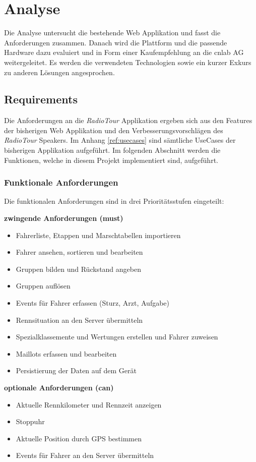 \chapter{Analyse}
Die Analyse untersucht die bestehende Web Applikation und fasst die Anforderungen zusammen. Danach wird die Plattform und die passende Hardware dazu evaluiert und in Form einer Kaufempfehlung an die cnlab AG weitergeleitet. Es werden die verwendeten Technologien sowie ein kurzer Exkurs zu anderen Lösungen angesprochen.

\section{Requirements}
Die Anforderungen an die \textit{RadioTour} Applikation ergeben sich aus den Features der bisherigen Web Applikation und den Verbesserungsvorschlägen des \textit{RadioTour} Speakers. Im Anhang \ref{ref:usecases} sind sämtliche UseCases der bisherigen Applikation aufgeführt. Im folgenden Abschnitt werden die Funktionen, welche in diesem Projekt implementiert sind, aufgeführt.

\subsection{Funktionale Anforderungen}
Die funktionalen Anforderungen sind in drei Prioritätsstufen eingeteilt:

\textbf{zwingende Anforderungen (must)}
\begin{itemize}
\item Fahrerliste, Etappen und Marschtabellen importieren
\item Fahrer ansehen, sortieren und bearbeiten
\item Gruppen bilden und Rückstand angeben
\item Gruppen auflösen
\item Events für Fahrer erfassen (Sturz, Arzt, Aufgabe)
\item Rennsituation an den Server übermitteln
\item Spezialklassemente und Wertungen erstellen und Fahrer zuweisen
\item Maillots erfassen und bearbeiten
\item Persistierung der Daten auf dem Gerät

\end{itemize}


\textbf{optionale Anforderungen (can)}
\begin{itemize}
\item Aktuelle Rennkilometer und Rennzeit anzeigen
\item Stoppuhr
\item Aktuelle Position durch GPS bestimmen
\item Events für Fahrer an den Server übermitteln
\end{itemize}



